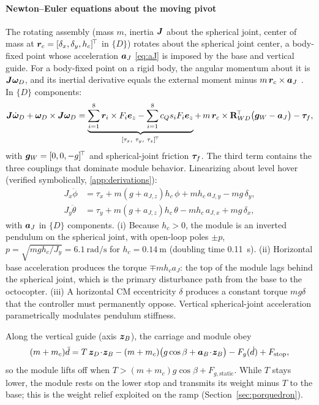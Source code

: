 \paragraph{Newton--Euler equations about the moving pivot}
The rotating assembly (mass $m$, inertia $\bm{J}$ about the spherical joint, center of mass at $\bm{r}_c=[\delta_x,\delta_y,h_c]^{\!\top}$ in $\{D\}$) rotates about the spherical joint center, a body-fixed point whose acceleration $\bm{a}_J$ \eqref{eq:aJ} is imposed by the base and vertical guide. For a body-fixed point on a rigid body, the angular momentum about it is $\bm{J}\bm{\omega}_D$, and its inertial derivative equals the external moment minus $m\,\bm{r}_c\times\bm{a}_J$ \cite{ginsberg1998}. In $\{D\}$ components:
\begin{equation}
  \bm{J}\dot{\bm{\omega}}_D+\bm{\omega}_D\times\bm{J}\bm{\omega}_D=
  \underbrace{\sum_{i=1}^{8}\bm{r}_i\times F_i\bm{e}_z-\sum_{i=1}^{8}c_Qs_iF_i\bm{e}_z}_{[\tau_x,\ \tau_y,\ \tau_z]^{\!\top}}
  +\,m\,\bm{r}_c\times\mathbf{R}_{WD}^{\!\top}\big(\bm{g}_W-\bm{a}_J\big)-\bm{\tau}_f ,
  \label{eq:euler}
\end{equation}
with $\bm{g}_W=[0,0,-g]^{\!\top}$ and spherical-joint friction $\bm{\tau}_f$. The third term contains the three couplings that dominate module behavior. Linearizing about level hover (verified symbolically, \ref{app:derivations}):
\begin{align}
  J_x\ddot\phi&=\tau_x+m(g+a_{J,z})h_c\,\phi+m h_c\,a_{J,y}-m g\,\delta_y, \label{eq:rolllin}\\
  J_y\ddot\theta&=\tau_y+m(g+a_{J,z})h_c\,\theta-m h_c\,a_{J,x}+m g\,\delta_x, \label{eq:pitchlin}
\end{align}
with $\bm{a}_J$ in $\{D\}$ components. (i) Because $h_c>0$, the module is an inverted pendulum on the spherical joint, with open-loop poles $\pm p$, $p=\sqrt{mgh_c/J_y}=\SI{6.1}{\radian\per\second}$ for $h_c=\SI{0.14}{\metre}$ (doubling time \SI{0.11}{\second}). (ii) Horizontal base acceleration produces the torque $\mp mh_ca_J$: the top of the module lags behind the spherical joint, which is the primary disturbance path from the base to the octocopter. (iii) A horizontal CM eccentricity $\delta$ produces a constant torque $mg\delta$ that the controller must permanently oppose. Vertical spherical-joint acceleration parametrically modulates pendulum stiffness.

Along the vertical guide (axis $\bm{z}_B$), the carriage and module obey
\begin{equation}
  (m+m_c)\ddot d=T\,\bm{z}_D\!\cdot\!\bm{z}_B-(m+m_c)\big(g\cos\beta+\bm{a}_B\!\cdot\!\bm{z}_B\big)-F_g(\dot d)+F_{\mathrm{stop}},
  \label{eq:guide}
\end{equation}
so the module lifts off when $T>(m+m_c)g\cos\beta+F_{g,\mathrm{static}}$. While $T$ stays lower, the module rests on the lower stop and transmits its weight minus $T$ to the base; this is the weight relief exploited on the ramp (Section~\ref{sec:porquedron}).

